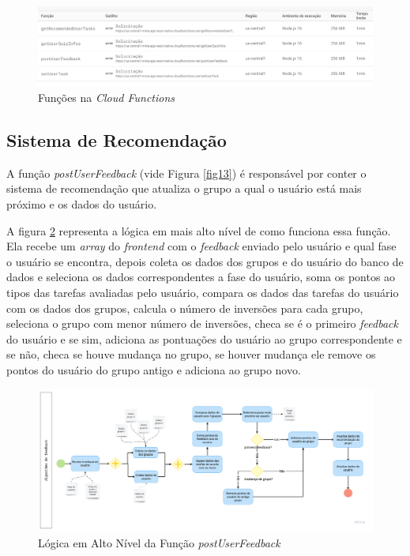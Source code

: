 \begin{figure}[ht]
    \centering
    \includegraphics[keepaspectratio=true,scale=0.42]{figuras/funcoes.png}
    \caption{Funções na \emph{Cloud Functions}}
        \label{fig14}
\end{figure}


\subsection{Sistema de Recomendação}

A função \emph{postUserFeedback} (vide Figura \ref{fig13}) é responsável por conter o sistema de 
recomendação que atualiza o grupo a qual o usuário está mais próximo e os dados do usuário. 

A figura \ref{fig15} representa a lógica em mais alto nível de como funciona essa função. Ela recebe 
um \emph{array} do \emph{frontend} com o \emph{feedback} enviado pelo usuário e qual fase o usuário se encontra, 
depois coleta os dados dos grupos e do usuário do banco de dados e seleciona os dados correspondentes a fase 
do usuário, soma os pontos ao tipos das tarefas avaliadas pelo usuário, compara os dados das tarefas do usuário 
com os dados dos grupos, calcula o número de inversões para cada grupo, seleciona o grupo com menor 
número de inversões, checa se é o primeiro \emph{feedback} do usuário e se sim, adiciona as pontuações do usuário ao grupo correspondente 
e se não, checa se houve mudança no grupo, se houver mudança ele remove os pontos do usuário do grupo antigo e adiciona ao grupo novo. 

\begin{figure}[ht]
    \centering
    \includegraphics[keepaspectratio=true,scale=0.14]{figuras/recomendacao.png}
    \caption{Lógica em Alto Nível da Função \emph{postUserFeedback }}
        \label{fig15}
\end{figure}

